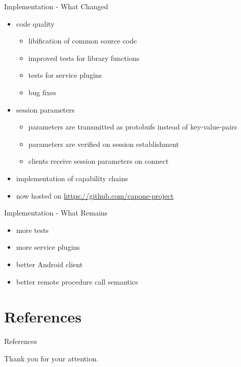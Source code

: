 \documentclass[a4paper]{beamer}
\begin{document}
\begin{frame}{Implementation - What Changed}
    \begin{itemize}
        \item code quality
            \begin{itemize}
                \item libification of common source code
                \item improved tests for library functions
                \item tests for service plugins
                \item bug fixes
            \end{itemize}
        \item session parameters
            \begin{itemize}
                \item parameters are transmitted as protobufs instead of key-value-pairs
                \item parameters are verified on session establishment
                \item clients receive session parameters on connect
            \end{itemize}
        \item implementation of capability chains
        \item now hosted on \url{https://github.com/capone-project}
    \end{itemize}
\end{frame}

\begin{frame}{Implementation - What Remains}
    \begin{itemize}
        \item more tests
        \item more service plugins
        \item better Android client
        \item better remote procedure call semantics
    \end{itemize}
\end{frame}

\section{References}

\begin{frame}[allowframebreaks]{References}
    
    {\Tiny }
\end{frame}

\begin{frame}[plain]
    \begin{center}
        Thank you for your attention.
    \end{center}
\end{frame}
\end{document}
